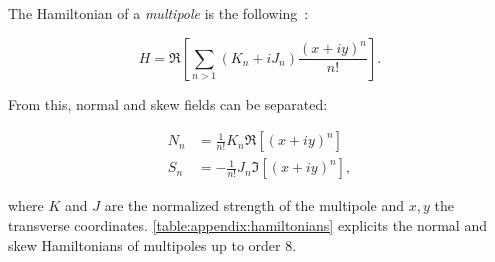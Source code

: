 \section{}

The Hamiltonian of a \textit{multipole} is the
following~\cite{keintzel_jacqueline_beam_nodate,tomas_direct_2003,franchi_studies_2006}:

\begin{equation}
    H = \Re \left[ \sum_{n>1} (K_n + iJ_n) \frac{(x+iy)^n}{n!} \right].
    \label{eq:appendix:transfer_maps:hamiltonian}
\end{equation}

From this, normal and skew fields can be separated:

\begin{equation}
    \begin{aligned}
        N_n &= \frac{1}{n!} K_n \Re \left[ (x+iy)^n \right] \\
        S_n &= -\frac{1}{n!} J_n \Im \left[ (x+iy)^n \right],
    \end{aligned}
\end{equation}

where $K$ and $J$ are the normalized strength of the multipole and $x,y$ the transverse coordinates.
\cref{table:appendix:hamiltonians} explicits the normal and skew Hamiltonians of multipoles up to
order 8.


